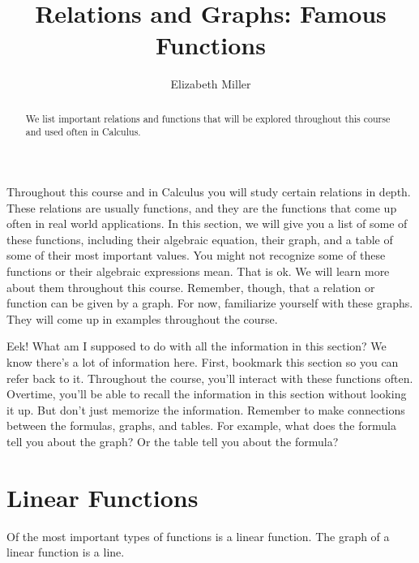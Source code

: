 \documentclass[nooutcomes]{ximera}
\author{Elizabeth Miller}
\title{Relations and Graphs: Famous Functions}
\begin{document}
\begin{abstract}
We list important relations and functions that will be explored throughout this course and used often in Calculus.
\end{abstract}
\maketitle


Throughout this course and in Calculus you will study certain relations in depth.  These relations are usually functions, and they are the functions that come up often in real world applications.  In this section, we will give you a list of some of these functions, including their algebraic equation, their graph, and a table of some of their most important values.  You might not recognize some of these functions or their algebraic expressions mean.  That is ok.  We will learn more about them throughout this course.  Remember, though, that a relation or function can be given by a graph.  For now, familiarize yourself with these graphs.  They will come up in examples throughout the course.

\begin{MM}
Eek! What am I supposed to do with all the information in this section? We know there's a lot of information here. First, bookmark this section so you can refer back to it. Throughout the course, you'll interact with these functions often. Overtime, you'll be able to recall the information in this section without looking it up. But don't just  memorize the information. Remember to make connections between the formulas, graphs, and tables. For example, what does the formula tell you about the graph? Or the table tell you about the formula?

\end{MM}

\newpage


\section{Linear Functions}
Of the most important types of functions is a linear function. The graph of a linear function is a line.  
\end{document}
